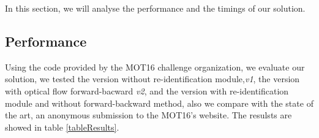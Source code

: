 \documentclass[12pt, a4paper, titlepage,twoside,openright]{article}
\begin{document}
In this section, we will analyse the performance and the timings of our solution.

\subsection{Performance}

Using the code provided by the MOT16 challenge organization, we evaluate our solution, we tested the version without re-identification module,\textit{v1}, the version with optical flow forward-bacward \textit{v2}, and the version with re-identification module and without forward-backward method, also we compare with the state of the art, an anonymous submission to the MOT16's website. The resulsts are showed in table \ref{tableResults}.


%
\end{document}
